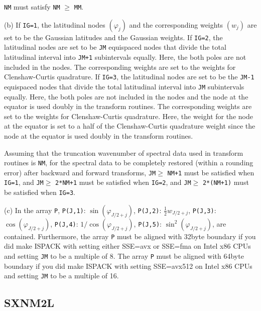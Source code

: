 \documentclass[a4paper]{scrartcl}
\begin{document}
\begin{enumerate}
\texttt{NM} must satisfy 
\texttt{NM} $\ge$ \texttt{MM}.

(b) If \texttt{IG=1}, the latitudinal nodes $(\varphi_j)$
and the corresponding weights $(w_j)$ are set to be the
Gaussian latitudes and the Gaussian weights.
If \texttt{IG=2}, the latitudinal nodes are set to be 
\texttt{JM} equispaced nodes that divide the total latitudinal
interval into \texttt{JM+1} subintervals equally. Here, 
the both poles are not included in the nodes.
The corresponding weights are set to the weights for
Clenshaw-Curtis quadrature.
If \texttt{IG=3}, the latitudinal nodes are set to be the
\texttt{JM-1} equispaced nodes that divide the total latitudinal
interval into \texttt{JM} subintervals equally. Here, 
the both poles are not included in the nodes and
the node at the equator is used doubly in the transform routines.
The corresponding weights are set to the weights for
Clenshaw-Curtis quadrature. Here, the weight for the node
at the equator is set to a half of the Clenshaw-Curtis quadrature
weight since
the node at the equator is used doubly in the transform routines.

Assuming that the truncation wavenumber of spectral data
used in transform routines is \texttt{NM},
for the spectral data to be completely restored (within a rounding
error) after backward and forward transforms,
\texttt{JM}$\ge$ \texttt{NM+1} must be satisfied when
\texttt{IG=1}, and
\texttt{JM}$\ge$ \texttt{2*NM+1} must be satisfied 
when \texttt{IG=2},
and
\texttt{JM}$\ge$ \texttt{2*(NM+1)} must be satisfied 
when \texttt{IG=3}.

(c) In the array \texttt{P}, 
   \texttt{P(J,1)}:  $\sin(\varphi_{J/2+j})$,
   \texttt{P(J,2)}:  $\frac12 w_{J/2+j}$, 
   \texttt{P(J,3)}:  $\cos(\varphi_{J/2+j})$,
   \texttt{P(J,4)}:  $1/\cos(\varphi_{J/2+j})$,
   \texttt{P(J,5)}:  $\sin^2(\varphi_{J/2+j})$,
are contained. Furthermore, the array \texttt{P}
must be aligned with 32byte boundary
if you did make ISPACK with setting either SSE=avx or SSE=fma
on Intel x86 CPUs and setting \texttt{JM} to be a multiple of 8.
The array \texttt{P} must be aligned with 64byte boundary
if you did make ISPACK with setting SSE=avx512
on Intel x86 CPUs and setting \texttt{JM} to be a multiple of 16.

\end{enumerate}


\subsection{SXNM2L}
\end{document}
